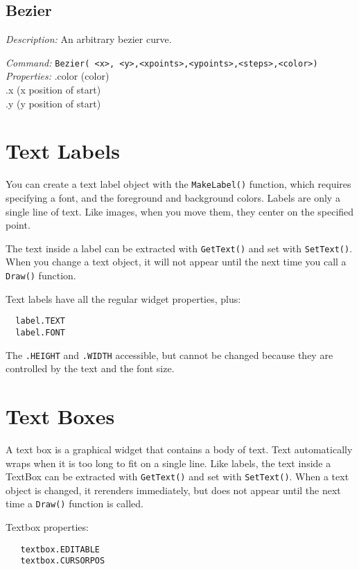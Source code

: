 \subsection{Bezier}
\emph{Description:} An arbitrary bezier curve.

\emph{Command:}  \verb+Bezier( <x>, <y>,<xpoints>,<ypoints>,<steps>,<color>)+\\

\emph{Properties:}
.color (color) \\
.x  (x position of start) \\
.y  (y position of start)\\


\section{Text Labels}

You can create a text label object with the \texttt{MakeLabel()} function, 
which requires specifying a font, and the foreground and background colors.  Labels are only a single line of text. Like images, when you move them,
they center on the specified point.

The text inside a label can be extracted with \texttt{GetText()} 
and set with \texttt{SetText()}. When you change a text object, 
it will not appear until the next time you call a \texttt{Draw()} function.

Text labels have all the regular widget properties, plus:
\begin{verbatim}
  label.TEXT 
  label.FONT
\end{verbatim}
  


The \verb+.HEIGHT+ and \verb+.WIDTH+ accessible, but cannot be changed
because they are controlled by the text and the font size.


\section{Text Boxes}

A text box is a graphical widget that contains a body of text.  Text
automatically wraps when it is too long to fit on a single line.  Like
labels, the text inside a TextBox can be extracted with
\texttt{GetText()} and set with \texttt{SetText()}. When a text object
is changed, it rerenders immediately, but does not appear until the
next time a \texttt{Draw()} function is called.


Textbox properties:
\begin{verbatim}
   textbox.EDITABLE
   textbox.CURSORPOS 
\end{verbatim}
 


